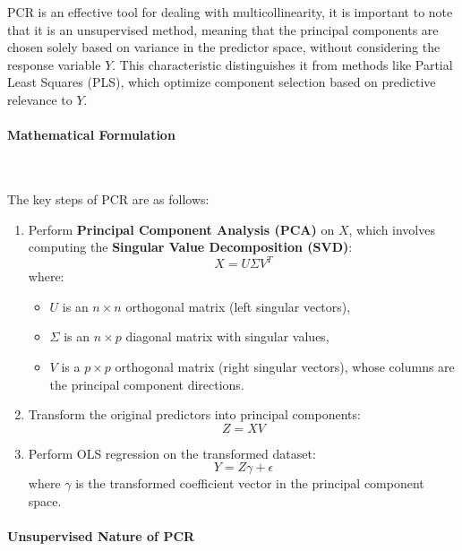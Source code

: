 \documentclass[11pt,twoside,a4paper]{article}
\begin{document}
PCR is an effective tool for dealing with multicollinearity, it is important to note that it is an unsupervised method, meaning that the principal components are chosen solely based on variance in the predictor space, without considering the response variable \( Y \). This characteristic distinguishes it from methods like Partial Least Squares (PLS), which optimize component selection based on predictive relevance to \( Y \).

\paragraph{Mathematical Formulation} \ \

The key steps of PCR are as follows:

\begin{enumerate}
    \item Perform \textbf{Principal Component Analysis (PCA)} on \( X \), which involves computing the \textbf{Singular Value Decomposition (SVD)}:
   \begin{equation}
    X = U \Sigma V^T
    \end{equation}
    where:
    \begin{itemize}
        \item \( U \) is an \( n \times n \) orthogonal matrix (left singular vectors),
        \item \( \Sigma \) is an \( n \times p \) diagonal matrix with singular values,
        \item \( V \) is a \( p \times p \) orthogonal matrix (right singular vectors), whose columns are the principal component directions.
    \end{itemize}
    
    \item Transform the original predictors into principal components:
    \begin{equation}
    Z = X V
    \end{equation}
 
    \item Perform OLS regression on the transformed dataset:
    \begin{equation}
    Y = Z \gamma + \epsilon
    \end{equation}
    where \( \gamma \) is the transformed coefficient vector in the principal component space.
  \end{enumerate}
  
 \paragraph{Unsupervised Nature of PCR} \ \
\end{document}
